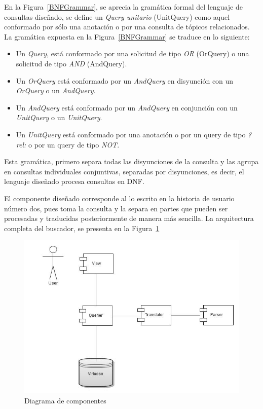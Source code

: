 \begin{itemize}
En la Figura~\ref{BNFGrammar}, se aprecia la gramática formal del lenguaje de consultas diseñado, se define un \textit{Query unitario} (UnitQuery) como aquel conformado por sólo una anotación o por una consulta de tópicos relacionados. La gramática expuesta en la Figura~\ref{BNFGrammar} se traduce en lo siguiente:

\begin{itemize}
    \item Un \textit{Query}, está conformado por una solicitud de tipo \textit{OR} (OrQuery) o una solicitud de tipo \textit{AND} (AndQuery).
    \item Un \textit{OrQuery} está conformado por un \textit{AndQuery} en disyunción con un \textit{OrQuery} o un \textit{AndQuery}.
    \item Un \textit{AndQuery} está conformado por un \textit{AndQuery} en conjunción con un \textit{UnitQuery} o un \textit{UnitQuery}.
    \item Un \textit{UnitQuery} está conformado por una anotación o por un query de tipo \textit{?rel:} o por un query de tipo \textit{NOT}.
\end{itemize}

Esta gramática, primero separa todas las disyunciones de la consulta y las agrupa en consultas individuales conjuntivas, separadas por disyunciones, es decir, el lenguaje diseñado procesa consultas en DNF.

El componente diseñado corresponde al lo escrito en la historia de usuario número dos, pues toma la consulta y la separa en partes que pueden ser procesadas y traducidas posteriormente de manera más sencilla. La arquitectura completa del buscador, se presenta en la Figura~\ref{searcher_architecture}

\begin{figure}[!h]
    \begin{center}
        \includegraphics[scale=0.4]{images/searcher_components.jpg}
        \caption{Diagrama de componentes}
        \label{searcher_architecture}
    \end{center}
\end{figure}


\end{itemize}
